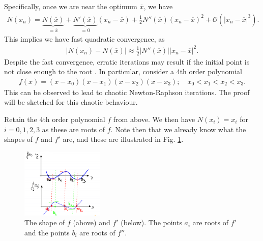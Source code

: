 \begin{ex}
Specifically, once we are near the optimum $\overline{x}$, we have
\begin{align}
	N(x_n) = \underbrace{N(\overline{x})}_{=\overline{x}} + \underbrace{N'(\overline{x})}_{=0}(x_n - \overline{x}) + \frac{1}{2} N''(\overline{x})(x_n - \overline{x})^{2} + \mathcal{O}\left( | x_n - \overline{x}|^{3}\right).
\end{align}
This implies we have fast quadratic convergence, as
\begin{align}
	\left| N(x_n) - N(\overline{x}) \right| \approx \frac{1}{2} | N''(\overline{x})| |x_{n} - \overline{x}|^{2}.
\end{align}
Despite the fast convergence, erratic iterations may result if the initial point is not close enough to the root \cite{SaariUrenko}. In particular, consider a 4th order polynomial 
\begin{align}
	f(x) = (x-x_0)(x-x_1)(x-x_2)(x-x_3);\quad x_0<x_1<x_2<x_3.
\end{align}
This can be observed to lead to chaotic Newton-Raphson iterations. The proof will be sketched for this chaotic behaviour.

Retain the 4th order polynomial $f$ from above. We then have $N(x_i)=x_i$ for $i=0,1,2,3$ as these are roots of $f$. Note then that we already know what the shapes of $f$ and $f'$ are, and these are illustrated in Fig. \ref{fig:NR_pf1}.
\begin{figure}[h!]
	\centering
	\includegraphics[width=0.35\textwidth]{figures/ch7/2NR_pf1.png}
	\caption{The shape of $f$ (above) and $f'$ (below). The points $a_i$ are roots of $f'$ and the points $b_{i}$ are roots of $f''$.}
	\label{fig:NR_pf1}
\end{figure}


\end{ex}
